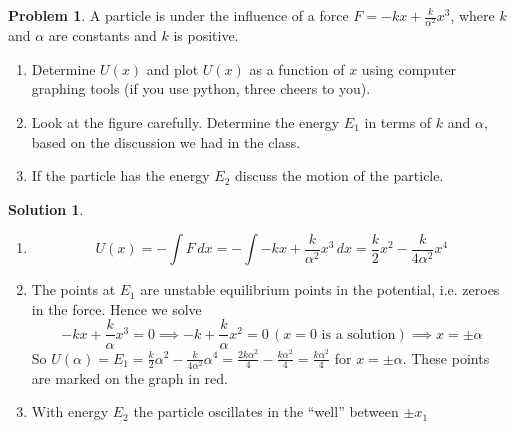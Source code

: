 \documentclass[10pt]{article}
\theoremstyle{definition}
\newtheorem{problem}{Problem}
\newtheorem{soln}{Solution}
\begin{document}
\begin{problem}
A particle is under the influence of a force $F=-kx+\frac{k}{\alpha^2}x^3$, where $k$ and $\alpha$
are constants and $k$ is positive.
\begin{enumerate}[label=(\alph*)]
  \item Determine $U(x)$ and plot $U(x)$ as a function of $x$ using
        computer graphing tools (if you use python, three cheers
        to you).
  \item Look at the figure carefully. Determine the
        energy $E_1$ in terms of $k$ and $\alpha$, based on the discussion
        we had in the class.
  \item If the particle has the energy $E_2$
        discuss the motion of the particle.
\end{enumerate}
\end{problem}
\begin{soln}~
  \begin{enumerate}[label=(\alph*)]
    \item $$U(x)=-\int F\,dx=-\int -kx+\frac{k}{\alpha^2}x^3\,dx=\frac{k}{2}x^2-\frac{k}{4\alpha^2}x^4$$
          \begin{center}
          \end{center}
    \item The points at $E_1$ are unstable equilibrium points in the potential, i.e. zeroes in the force. Hence we solve
          $$-kx+\frac{k}{\alpha}x^3=0\implies -k+\frac{k}{\alpha}x^2=0\, (x=0\text{ is a solution})\implies x=\pm\alpha$$
          So $U(\alpha)=E_1=\frac{k}{2}\alpha^2-\frac{k}{4\alpha^2}\alpha^4=\frac{2k\alpha^2}{4}-\frac{k\alpha^2}{4}=\frac{k\alpha^2}{4}$ for $x=\pm\alpha$. These points are marked on the graph in red.
    \item With energy $E_2$ the particle oscillates in the ``well'' between $\pm x_1$
  \end{enumerate}
\end{soln}
\newpage
\end{document}
